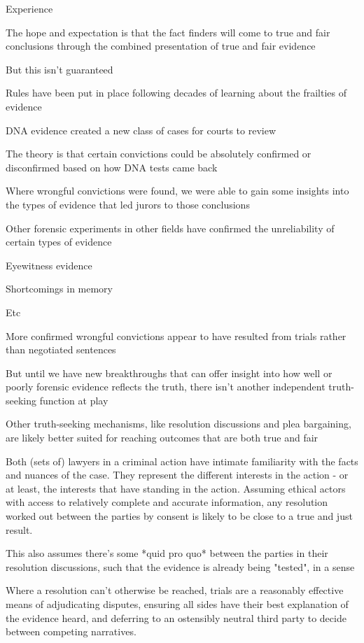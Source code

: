 Experience

The hope and expectation is that the fact finders will come to true and fair conclusions through the combined presentation of true and fair evidence

But this isn't guaranteed

Rules have been put in place following decades of learning about the frailties of evidence

DNA evidence created a new class of cases for courts to review

The theory is that certain convictions could be absolutely confirmed or disconfirmed based on how DNA tests came back

Where wrongful convictions were found, we were able to gain some insights into the types of evidence that led jurors to those conclusions

Other forensic experiments in other fields have confirmed the unreliability of certain types of evidence

Eyewitness evidence

Shortcomings in memory

Etc

More confirmed wrongful convictions appear to have resulted from trials rather than negotiated sentences

But until we have new breakthroughs that can offer insight into how well or poorly forensic evidence reflects the truth, there isn't another independent truth-seeking function at play

Other truth-seeking mechanisms, like resolution discussions and plea bargaining, are likely better suited for reaching outcomes that are both true and fair

Both (sets of) lawyers in a criminal action have intimate familiarity with the facts and nuances of the case. They represent the different interests in the action - or at least, the interests that have standing in the action. Assuming ethical actors with access to relatively complete and accurate information, any resolution worked out between the parties by consent is likely to be close to a true and just result.

This also assumes there's some *quid pro quo* between the parties in their resolution discussions, such that the evidence is already being "tested", in a sense

Where a resolution can't otherwise be reached, trials are a reasonably effective means of adjudicating disputes, ensuring all sides have their best explanation of the evidence heard, and deferring to an ostensibly neutral third party to decide between competing narratives.

